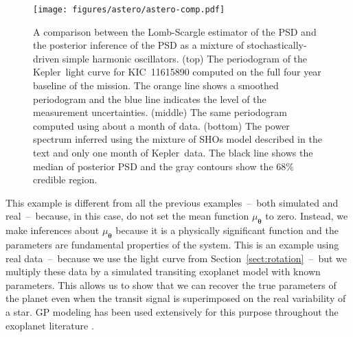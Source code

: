 \documentclass[manuscript, letterpaper]{aastex6}
\makeatletter
\let\origsubsection\subsection
\renewcommand\subsection{\@ifstar{\starsubsection}{\nostarsubsection}}
\newcommand\nostarsubsection[1]{\subsectionprelude\origsubsection{#1}}
\newcommand\starsubsection[1]{\subsectionprelude\origsubsection*{#1}}
\newcommand\subsectionprelude{\vspace{1em}}
\newcommand{\project}[1]{\textsf{#1}}
\newcommand{\kepler}{\project{Kepler}}
\newcommand{\figurelabel}[1]{\label{fig:#1}}
\newcommand{\sectionname}{Section}
\newcommand{\sectref}[1]{\ref{sect:#1}}
\newcommand{\Sect}[1]{\sectionname~\sectref{#1}}
\newcommand{\sect}[1]{\Sect{#1}}
\newcommand{\sectlabel}[1]{\label{sect:#1}}
\newcommand{\bvec}[1]{{\ensuremath{\boldsymbol{#1}}}}
\newcommand{\response}[1]{{#1}}
\makeatother
\begin{document}
\begin{figure}[!p]
    \begin{center}
        \texttt{[image: figures/astero/astero-comp.pdf]}
        \caption{A comparison between the Lomb-Scargle estimator of the PSD and the
            posterior inference of the PSD as a mixture of stochastically-driven simple
            harmonic oscillators.
            (top) The periodogram of the \kepler\ light curve for KIC~11615890 computed
            on the full four year baseline of the mission. The orange line shows a
            smoothed periodogram and the blue line indicates the level of the
            measurement uncertainties.
            (middle) The same periodogram computed using about a month of data.
            (bottom) The power spectrum inferred using the mixture of SHOs model described
            in the text and only one month of \kepler\ data.
            The black line shows the median of posterior PSD and the gray contours
            show the 68\% credible region.
            \figurelabel{astero_psd}}
    \end{center}
\end{figure}

\newpage
\subsection{Example 5: Exoplanet transit fitting}\sectlabel{transit}

\response{
    This example is different from all the previous examples~--~both simulated and
    real~--~because, in this case, do not set the mean function $\mu_\bvec{\theta}$
    to zero.
    Instead, we make inferences about $\mu_\bvec{\theta}$ because it is a
    physically significant function and the parameters are fundamental properties
    of the system.
    This is an example using real data~--~because we use the light curve from
    \sect{rotation}~--~but we multiply these data by a simulated transiting
    exoplanet model with known parameters.
    This allows us to show that we can recover the true parameters of the planet
    even when the transit signal is superimposed on the real variability of a
    star.
}
GP modeling has been used extensively for this purpose throughout the
exoplanet literature \citep[for example][]{Dawson:2014, Barclay:2015,
    Evans:2015, Foreman-Mackey:2016b, Grunblatt:2016}.
\end{document}
